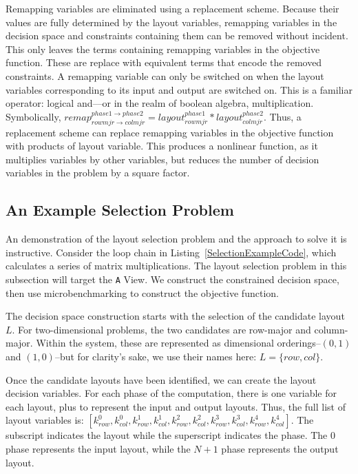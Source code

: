 Remapping variables are eliminated using a replacement scheme. 
Because their values are fully determined by the layout variables, remapping variables in the decision space and constraints containing them can be removed without incident.
This only leaves the terms containing remapping variables in the objective function.
These are replace with equivalent terms that encode the removed constraints.
A remapping variable can only be switched on when the layout variables corresponding to its input and output are switched on.
This is a familiar operator: logical and––or in the realm of boolean algebra, multiplication.
Symbolically, $remap_{rowmjr \rightarrow colmjr}^{phase1 \rightarrow phase2} = layout_{rowmjr}^{phase1} * layout_{colmjr}^{phase2}$.
Thus, a replacement scheme can replace remapping variables in the objective function with products of layout variable.
This produces a nonlinear function, as it multiplies variables by other variables, but reduces the number of decision variables in the problem by a square factor.


\subsection{An Example Selection Problem}

An demonstration of the layout selection problem and the approach to solve it is instructive.
Consider the loop chain in Listing~\ref{SelectionExampleCode}, which calculates a series of matrix multiplications.
The layout selection problem in this subsection will target the \verb.A. View.
We construct the constrained decision space, then use microbenchmarking to construct the objective function.

The decision space construction starts with the selection of the candidate layout $L$.
For two-dimensional problems, the two candidates are row-major and column-major.
Within the system, these are represented as dimensional orderings--$(0,1)$ and $(1,0)$--but for clarity's sake, we use their names here: $L=\{row,col\}$.

Once the candidate layouts have been identified, we can create the layout decision variables.
For each phase of the computation, there is one variable for each layout, plus to represent the input and output layouts.
Thus, the full list of layout variables is: $[k_{row}^{0}, k_{col}^{0}, k_{row}^{1}, k_{col}^{1},k_{row}^{2}, k_{col}^{2},k_{row}^{3}, k_{col}^{3},k_{row}^{4}, k_{col}^{4}]$.
The subscript indicates the layout while the superscript indicates the phase. 
The 0 phase represents the input layout, while the $N+1$ phase represents the output layout.

